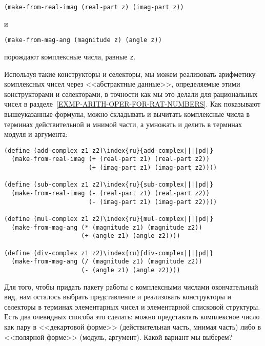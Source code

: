 \begin{Verbatim}[fontsize=\small]
(make-from-real-imag (real-part z) (imag-part z))
\end{Verbatim}
и

\begin{Verbatim}[fontsize=\small]
(make-from-mag-ang (magnitude z) (angle z))
\end{Verbatim}
порождают комплексные числа, равные {\tt z}.

Используя такие конструкторы и селекторы, мы можем
реализовать арифметику комплексных чисел через
<<абстрактные данные>>, определяемые этими конструкторами и селекторами, в
точности как мы это делали для рациональных чисел в разделе~\ref{EXMP-ARITH-OPER-FOR-RAT-NUMBERS}.
Как показывают вышеуказанные формулы, можно складывать и вычитать
комплексные числа в терминах действительной и мнимой части, а умножать и
делить в терминах модуля и аргумента:

\begin{Verbatim}[fontsize=\small]
(define (add-complex z1 z2)\index{ru}{add-complex||||pd|}
  (make-from-real-imag (+ (real-part z1) (real-part z2))
                       (+ (imag-part z1) (imag-part z2))))

(define (sub-complex z1 z2)\index{ru}{sub-complex||||pd|}
  (make-from-real-imag (- (real-part z1) (real-part z2))
                       (- (imag-part z1) (imag-part z2))))

(define (mul-complex z1 z2)\index{ru}{mul-complex||||pd|}
  (make-from-mag-ang (* (magnitude z1) (magnitude z2))
                     (+ (angle z1) (angle z2))))

(define (div-complex z1 z2)\index{ru}{div-complex||||pd|}
  (make-from-mag-ang (/ (magnitude z1) (magnitude z2))
                     (- (angle z1) (angle z2))))
\end{Verbatim}

Для того, чтобы придать пакету работы с комплексными числами 
окончательный вид, нам
осталось выбрать представление и реализовать конструкторы и селекторы в
терминах элементарных чисел и элементарной списковой структуры.  Есть
два очевидных способа это сделать: можно представлять комплексное
число как пару в <<декартовой форме>> (действительная часть, мнимая
часть) либо в <<полярной форме>> (модуль, аргумент).  Какой вариант мы 
выберем?

